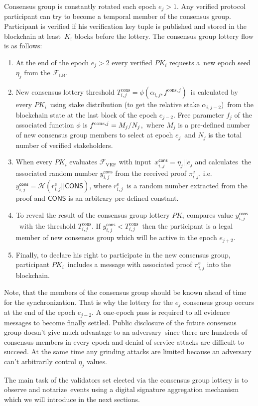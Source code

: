 Consensus group is constantly rotated each epoch ${e_j \gt 1}$.
Any verified protocol participant can try to become a temporal member of the consensus group.
Participant is verified if his verification key tuple is published and stored in the blockchain at least\
$K_{\text{f}}$ blocks before the lottery.
The consensus group lottery flow is as follows:
\begin{enumerate}
    \item At the end of the epoch ${e_j \gt 2}$ every verified $PK_i$ requests a\
    new epoch seed $\eta_j$ from the ${\mathcal{F}}_{\text{LB}}$.
    \item New consensus lottery threshold $T_{i, j}^{\text{cons}} = \phi(\alpha_{i, j}, f^{\text{cons}, j})$\
    is calculated by every $PK_i$\ using stake distribution (to get the relative stake $\alpha_{i, j - 2}$)\
    from the blockchain state at the last block of the epoch $e_{j - 2}$.
    Free parameter $f_j$ of the associated function $\phi$ is ${f^{\text{cons}, j} = M_j /\/ N_j}$,\
    where $M_j$ is a pre-defined number of new consensus group members to select at epoch $e_j$\
    and $N_j$ is the total number of verified stakeholders.
    \item When every $PK_i$ evaluates ${\mathcal{F}}_{\text{VRF}}$ with input\
    $x_{i, j}^{\textsf{cons}} = \eta_j || e_j $ and calculates\
    the associated random number $y_{i, j}^{\textsf{cons}}$ from the received proof $\pi_{i, j}^{\text{e}}$, i.e.\
    ${y_{i, j}^{\textsf{cons}} = \mathcal{H}(r_{i, j}^{\text{e}}||\textsf{CONS})}$, where $r_{i, j}^{\text{e}}$\
    is a random number extracted from the proof and $\textsf{CONS}$ is an arbitrary pre-defined constant.
    \item To reveal the result of the consensus group lottery $PK_i$ compares value $y_{i, j}^{\textsf{cons}}$\
    with the threshold $T_{i, j}^{\text{cons}}$.
    If ${y_{i, j}^{\textsf{cons}} < T_{i, j}^{\text{cons}}}$\
    then the participant is a legal member of new consensus group which will be active in the epoch $e_{j+2}$.
    \item Finally, to declare his right to participate in the new consensus group, participant $PK_i$\
    includes a message with associated proof $\pi_{i, j}^{\text{e}}$ into the blockchain.
\end{enumerate}
Note, that the members of the consensus group should be known ahead of time for the synchronization.
That is why the lottery for the $e_{j}$ consensus group occurs at the end of the epoch $e_{j - 2}$.
A one-epoch pass is required to all evidence messages to become finally settled.
Public disclosure of the future consensus group doesn't give much advantage to an adversary\
since there are hundreds of consensus members in every epoch and denial of service attacks are difficult to succeed.
At the same time any grinding attacks are limited because an adversary can't arbitrarily control $\eta_j$ values.

The main task of the validators set elected via the consensus group lottery is to observe and notarize\
events using a digital signature aggregation mechanism which we will introduce in the next sections.
